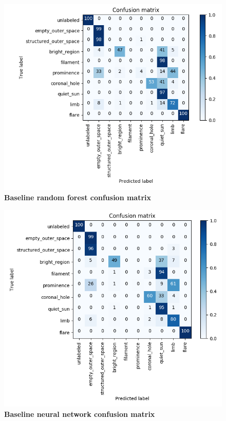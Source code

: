 \documentclass[twoside]{report}
\begin{document}
\begin{figure}[ht]
  \begin{center}
    \includegraphics[scale=0.8]{base_rf_conf}
    \caption{{\bf Baseline random forest confusion matrix}}
    \label{fig:base-rf-conf}
 \end{center}
\end{figure}

\begin{figure}[ht]
  \begin{center}
    \includegraphics[scale=0.8]{base_nn_conf}
    \caption{{\bf Baseline neural network confusion matrix}}
    \label{fig:base-nn-conf}
 \end{center}
\end{figure}
\end{document}
